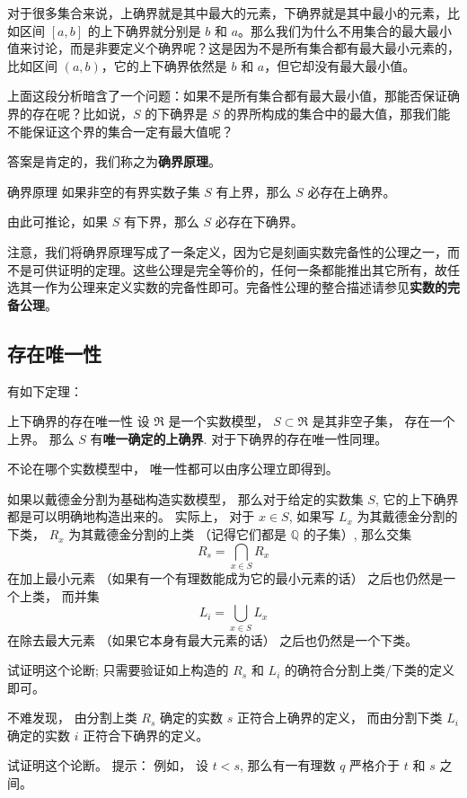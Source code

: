 对于很多集合来说，上确界就是其中最大的元素，下确界就是其中最小的元素，比如区间 $[a, b]$ 的上下确界就分别是 $b$ 和 $a$。那么我们为什么不用集合的最大最小值来讨论，而是非要定义个确界呢？这是因为不是所有集合都有最大最小元素的，比如区间 $(a, b)$，它的上下确界依然是 $b$ 和 $a$，但它却没有最大最小值。

上面这段分析暗含了一个问题：如果不是所有集合都有最大最小值，那能否保证确界的存在呢？比如说，$S$ 的下确界是 $S$ 的界所构成的集合中的最大值，那我们能不能保证这个界的集合一定有最大值呢？

答案是肯定的，我们称之为\textbf{确界原理}。

\begin{definition}{确界原理}
如果非空的有界实数子集 $S$ 有上界，那么 $S$ 必存在上确界。

由此可推论，如果 $S$ 有下界，那么 $S$ 必存在下确界。
\end{definition}

注意，我们将确界原理写成了一条定义，因为它是刻画实数完备性的公理之一，而不是可供证明的定理。这些公理是完全等价的，任何一条都能推出其它所有，故任选其一作为公理来定义实数的完备性即可。完备性公理的整合描述请参见\textbf{实数的完备公理}。

\subsection{存在唯一性}
有如下定理：

\begin{theorem}{上下确界的存在唯一性}
设 $\mathfrak{R}$ 是一个实数模型， $S\subset\mathfrak{R}$ 是其非空子集， 存在一个上界。 那么 $S$ 有\textbf{唯一确定的上确界}. 对于下确界的存在唯一性同理。
\end{theorem}

不论在哪个实数模型中， 唯一性都可以由序公理立即得到。

如果以戴德金分割为基础构造实数模型， 那么对于给定的实数集 $S$, 它的上下确界都是可以明确地构造出来的。 实际上， 对于 $x\in S$, 如果写 $L_x$ 为其戴德金分割的下类， $R_x$ 为其戴德金分割的上类 （记得它们都是 $\mathbb{Q}$ 的子集）, 那么交集
$$
R_s=\bigcap_{x\in S}R_x
$$
在加上最小元素 （如果有一个有理数能成为它的最小元素的话） 之后也仍然是一个上类， 而并集
$$
L_i=\bigcup_{x\in S}L_x
$$
在除去最大元素 （如果它本身有最大元素的话） 之后也仍然是一个下类。

\begin{exercise}{}
试证明这个论断; 只需要验证如上构造的 $R_s$ 和 $L_i$ 的确符合分割上类/下类的定义即可。
\end{exercise}

不难发现， 由分割上类 $R_s$ 确定的实数 $s$ 正符合上确界的定义， 而由分割下类 $L_i$ 确定的实数 $i$ 正符合下确界的定义。

\begin{exercise}{}
试证明这个论断。 提示： 例如， 设 $t<s$, 那么有一有理数 $q$ 严格介于 $t$ 和 $s$ 之间。 
\end{exercise}
